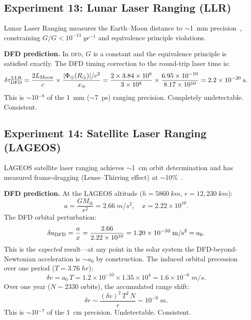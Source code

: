 \documentclass[aps,prd,twocolumn,superscriptaddress,nofootinbib,longbibliography]{revtex4-2}
\newcommand{\DFD}{\textsc{dfd}}
\begin{document}
\subsection{Experiment 13: Lunar Laser Ranging (LLR)}\label{sec:LLR}

Lunar Laser Ranging measures the Earth--Moon distance to $\sim$1~mm
precision~\cite{Williams2004}, constraining $\dot{G}/G < 10^{-13}\;\si{yr^{-1}}$
and equivalence principle violations.

\textbf{DFD prediction.} In \DFD, $G$ is a constant and the equivalence
principle is satisfied exactly. The DFD timing correction to the
round-trip laser time is:
\begin{equation}
\delta\tau_{\rm DFD}^{\rm LLR} = \frac{2L_{\rm Moon}}{c}\times\frac{|\Phi_\oplus(R_\oplus)|/c^2}{x_\oplus}
= \frac{2\times3.84\times10^8}{3\times10^8}\times\frac{6.95\times10^{-10}}{8.17\times10^{10}}
= 2.2\times10^{-20}\;\si{s}.
\end{equation}
This is $\sim$10$^{-8}$ of the 1~mm ($\sim$7~ps) ranging precision.
Completely undetectable. Consistent.

\subsection{Experiment 14: Satellite Laser Ranging (LAGEOS)}\label{sec:SLR}

LAGEOS satellite laser ranging achieves $\sim$1~cm orbit determination
and has measured frame-dragging (Lense--Thirring effect) at
$\sim$10\%~\cite{Ciufolini2004}.

\textbf{DFD prediction.} At the LAGEOS altitude ($h = 5860\;\si{km}$,
$r = 12{,}230\;\si{km}$):
\begin{equation}
a = \frac{GM_\oplus}{r^2} = 2.66\;\si{m/s^2}, \quad
x = 2.22\times10^{10}.
\end{equation}
The DFD orbital perturbation:
\begin{equation}
\delta a_{\rm DFD} = \frac{a}{x} = \frac{2.66}{2.22\times10^{10}}
= 1.20\times10^{-10}\;\si{m/s^2} = a_0.
\end{equation}
This is the \emph{expected} result---at any point in the solar system
the DFD-beyond-Newtonian acceleration is $\sim a_0$ by construction.
The induced orbital precession over one period ($T = 3.76\;\si{hr}$):
\begin{equation}
\delta v = a_0\,T = 1.2\times10^{-10}\times1.35\times10^4
= 1.6\times10^{-6}\;\si{m/s}.
\end{equation}
Over one year ($N \sim 2330$ orbits), the accumulated range shift:
\begin{equation}
\delta r \sim \frac{(\delta v)^2\,T^2\,N}{r} \sim 10^{-9}\;\si{m}.
\end{equation}
This is $\sim$10$^{-7}$ of the 1~cm precision. Undetectable. Consistent.
\end{document}
